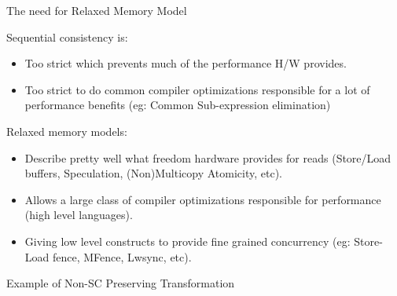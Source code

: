 \documentclass{beamer}
\begin{document}
    \begin{frame}{The need for Relaxed Memory Model}

        Sequential consistency is:
        \begin{itemize}
            \item Too strict which prevents much of the performance H/W provides.
            \item Too strict to do common compiler optimizations responsible for a lot of performance benefits (eg: Common Sub-expression elimination)
        \end{itemize}

        Relaxed memory models:
        \begin{itemize}
            \item Describe pretty well what freedom hardware provides for reads (Store/Load buffers, Speculation, (Non)Multicopy Atomicity, etc). 
            \item Allows a large class of compiler optimizations responsible for performance (high level languages).  
            \item Giving low level constructs to provide fine grained concurrency (eg: Store-Load fence, MFence, Lwsync, etc).
        \end{itemize}

    \end{frame}

    \begin{frame}{Example of Non-SC Preserving Transformation}

        \begin{figure}
        \end{figure}

    \end{frame}

\end{document}
